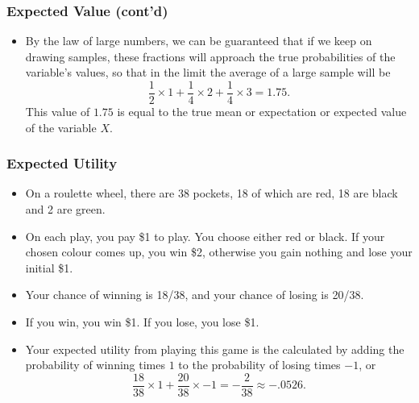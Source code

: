 \documentclass[10pt,xcolor=dvipsnames,serif,professionalfont]{beamer} %
\begin{document}
\begin{frame}
\frametitle{Expected Value (cont'd)}
\begin{itemize}
\item By the law of large numbers, we can be guaranteed that if we keep on drawing samples, these fractions will approach the true probabilities of the variable's values, so that in the limit the average of a large sample will be 
\[
\frac{1}{2} \times 1 + \frac{1}{4} \times 2 + \frac{1}{4} \times 3 = 1.75.
\]
This value of $1.75$ is equal to the true mean or expectation or expected value of the variable $X$. 

\end{itemize}
\end{frame}


\begin{frame}
\frametitle{Expected Utility} 
\begin{itemize}
\item On a roulette wheel, there are 38 pockets, 18 of which are red, 18 are black and 2 are
green. 
\item On each play, you pay \$1 to play. You choose either red or black. If
your chosen colour comes up, you win \$2, otherwise you gain nothing and lose
your initial \$1.
\item Your chance of winning is 18/38, and your chance of losing is 20/38.
\item If you win, you win \$1. If you lose, you lose \$1.
\item Your expected utility from playing this game
is the calculated by adding the probability of winning times $1$ to the
probability of losing times $-1$, or
\begin{equation}
\frac{18}{38}\times 1 + \frac{20}{38} \times -1 = -\frac{2}{38} \approx -.0526.
\end{equation}

\end{itemize}
\end{frame}
\end{document}
